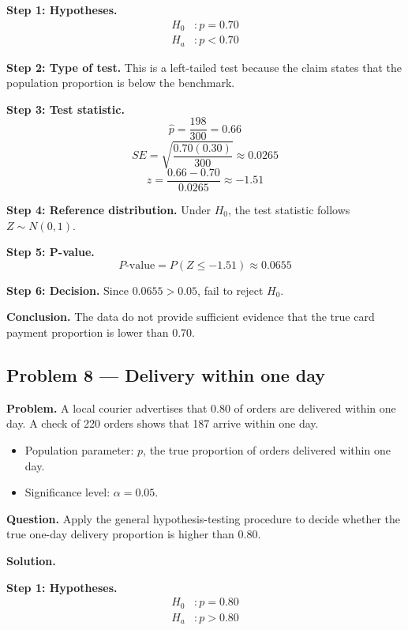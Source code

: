 \begin{ExamProblems}
\textbf{Step 1: Hypotheses.}
\[
\begin{aligned}
H_0&: p = 0.70 \\
H_a&: p < 0.70
\end{aligned}
\]

\textbf{Step 2: Type of test.} This is a left-tailed test because the claim states that the population proportion is below the benchmark.

\textbf{Step 3: Test statistic.}
\[
\hat{p}=\frac{198}{300}=0.66
\]
\[
SE=\sqrt{\frac{0.70(0.30)}{300}}\approx 0.0265
\]
\[
z=\frac{0.66-0.70}{0.0265}\approx -1.51
\]

\textbf{Step 4: Reference distribution.} Under \(H_0\), the test statistic follows \(Z\sim N(0,1)\).

\textbf{Step 5: P-value.}
\[
P\text{-value}=P(Z\le -1.51)\approx 0.0655
\]

\textbf{Step 6: Decision.} Since \(0.0655>0.05\), fail to reject \(H_0\).

\textbf{Conclusion.} The data do not provide sufficient evidence that the true card payment proportion is lower than 0.70.

\hypertarget{c4-ex8}{}
\item
\subsection*{Problem 8 — Delivery within one day}

\textbf{Problem.} A local courier advertises that 0.80 of orders are delivered within one day. A check of 220 orders shows that 187 arrive within one day.
\begin{itemize}
    \item Population parameter: \(p\), the true proportion of orders delivered within one day.
    \item Significance level: \(\alpha=0.05\).
\end{itemize}

\textbf{Question.} Apply the general hypothesis-testing procedure to decide whether the true one-day delivery proportion is higher than 0.80.

\textbf{Solution.}

\textbf{Step 1: Hypotheses.}
\[
\begin{aligned}
H_0&: p = 0.80 \\
H_a&: p > 0.80
\end{aligned}
\]


\end{ExamProblems}
